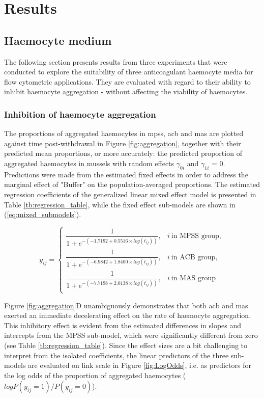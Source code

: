 \chapter{Results}
\label{chap:results_method_development}

\section{Haemocyte medium}
The following section presents results from three experiments that were conducted to explore the suitability of three anticoagulant haemocyte media for flow cytometric applications. They are evaluated with regard to their ability to inhibit haemocyte aggregation - without affecting the viability of haemocytes.

\subsection{Inhibition of haemocyte aggregation}
The proportions of aggregated haemocytes in \acrshort{mpss}, \acrshort{acb} and \acrshort{mas} are plotted against time post-withdrawal in Figure \ref{fig:aggregation}, together with their predicted mean proportions, or more accurately: the predicted proportion of aggregated haemocytes in mussels with random effects $\gamma_{0i}$ and $\gamma_{1i}$ = 0. Predictions were made from the estimated fixed effects in order to address the marginal effect of "Buffer" on the population-averaged proportions. The estimated regression coefficients of the generalized linear mixed effect model is presented in Table \ref{tb:regression_table}, while the fixed effect sub-models are shown in (\ref{eq:mixed_submodels}).

\begin{equation}
    \label{eq:mixed_submodels}
    y_{ij} = \begin{cases}
        \dfrac{1}{1 + e^{-(-1.7192 + 0.5516 \times log(t_{ij}))}},  & i \: \text{in MPSS group}, \\
        \dfrac{1}{1 + e^{-(-6.9842 + 1.8400 \times log(t_{ij}))}},  & i \: \text{in ACB group}, \\
        \dfrac{1}{1 + e^{-(-7.7198 + 2.0138 \times log(t_{ij}))}},  & i \: \text{in MAS group} \\
    \end{cases}
\end{equation}

Figure \ref{fig:aggregation}D unambiguously demonstrates that both \acrshort{acb} and \acrshort{mas} exerted an immediate decelerating effect on the rate of haemocyte aggregation. This inhibitory effect is evident from the estimated differences in slopes and intercepts from the MPSS sub-model, which were significantly different from zero (see Table \ref{tb:regression_table}). Since the effect sizes are a bit challenging to interpret from the isolated coefficients, the linear predictors of the three sub-models are evaluated on link scale in Figure \ref{fig:LogOdds}, i.e. as predictors for the log odds of the proportion of aggregated haemocytes ($log P(y_{ij} = 1) / P(y_{ij} = 0)$).

